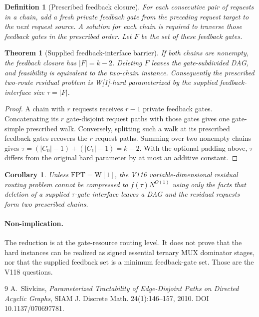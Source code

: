 \documentclass[11pt]{article}
\newtheorem{theorem}{Theorem}
\newtheorem{corollary}{Corollary}
\newtheorem{definition}{Definition}
\begin{document}
\begin{definition}[Prescribed feedback closure]
For each consecutive pair of requests in a chain, add a fresh private feedback gate from the preceding request target to the next request source. A solution for each chain is required to traverse those feedback gates in the prescribed order. Let $F$ be the set of these feedback gates.
\end{definition}

\begin{theorem}[Supplied feedback-interface barrier]
If both chains are nonempty, the feedback closure has $|F|=k-2$. Deleting $F$ leaves the gate-subdivided DAG, and feasibility is equivalent to the two-chain instance. Consequently the prescribed two-route residual problem is W[1]-hard parameterized by the supplied feedback-interface size $\tau=|F|$.
\end{theorem}
\begin{proof}
A chain with $r$ requests receives $r-1$ private feedback gates. Concatenating its $r$ gate-disjoint request paths with those gates gives one gate-simple prescribed walk. Conversely, splitting such a walk at its prescribed feedback gates recovers the $r$ request paths. Summing over two nonempty chains gives $\tau=(|C_0|-1)+(|C_1|-1)=k-2$. With the optional padding above, $\tau$ differs from the original hard parameter by at most an additive constant.
\end{proof}

\begin{corollary}
Unless $\mathrm{FPT}=\mathrm{W[1]}$, the V116 variable-dimensional residual routing problem cannot be compressed to $f(\tau)N^{O(1)}$ using only the facts that deletion of a supplied $\tau$-gate interface leaves a DAG and the residual requests form two prescribed chains.
\end{corollary}

\paragraph{Non-implication.}
The reduction is at the gate-resource routing level. It does not prove that the hard instances can be realized as signed essential ternary MUX dominator stages, nor that the supplied feedback set is a minimum feedback-gate set. Those are the V118 questions.

\begin{thebibliography}{9}
A.~Slivkins, \emph{Parameterized Tractability of Edge-Disjoint Paths on Directed Acyclic Graphs}, SIAM J. Discrete Math. 24(1):146--157, 2010. DOI 10.1137/070697781.
\end{thebibliography}
\end{document}
